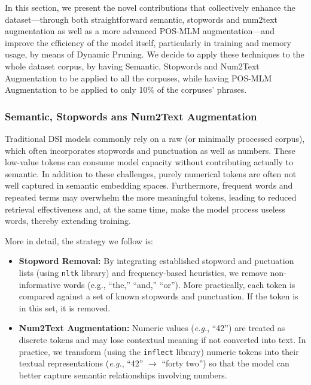 In this section, we present the novel contributions that collectively enhance the dataset—through both straightforward semantic, stopwords and num2text augmentation as well as a more advanced POS-MLM augmentation—and improve the efficiency of the model itself, particularly in training and memory usage, by means of Dynamic Pruning. We decide to apply these techniques to the whole dataset corpus, by having Semantic, Stopwords and Num2Text Augmentation to be applied to all the corpuses, while having POS-MLM Augmentation to be applied to only 10\% of the corpuses' phrases.








\subsubsection{Semantic, Stopwords ans Num2Text Augmentation}
Traditional DSI models commonly rely on a raw (or minimally processed corpus), which often incorporates stopwords and punctuation as well as numbers. These low-value tokens can consume model capacity without contributing actually to semantic.  In addition to these challenges, purely numerical tokens are often not well captured in semantic embedding spaces. Furthermore, frequent words and repeated terms may overwhelm the more meaningful tokens, leading to reduced retrieval effectiveness and, at the same time, make the model process useless words, thereby extending training.

More in detail, the strategy we follow is:
\begin{itemize}
    \item \textbf{Stopword Removal:} By integrating established stopword and puctuation lists (using \texttt{nltk} library) and frequency-based heuristics, we remove non-informative words (e.g., ``the,'' ``and,'' ``or''). More practically, each token is compared against a set of known stopwords and punctuation. If the token is in this set, it is removed.
    \item \textbf{ Num2Text Augmentation:} Numeric values (\textit{e.g.}, ``42'') are treated as discrete tokens and may lose contextual meaning if not converted into text. In practice, we transform (using the \texttt{inflect} library) numeric tokens into their textual representations (\textit{e.g.}, ``42'' $\to$ ``forty two'') so that the model can better capture semantic relationships involving numbers.
\end{itemize}










